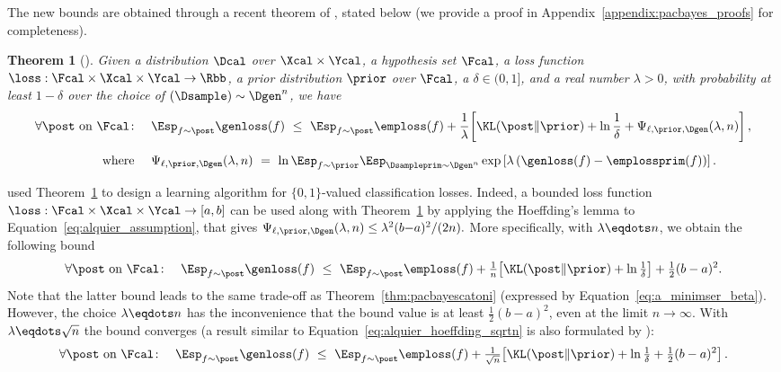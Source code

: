 \documentclass{article}
\newtheorem{thm}{Theorem}
\theoremstyle{definition}
\theoremstyle{plain}
\begin{document}
%
The new bounds are obtained through a recent theorem of \citet{alquier-15}, stated below
(we provide a proof in Appendix~\ref{appendix:pacbayes_proofs} for completeness).
%
%
%
%
\begin{thm}[\citet{alquier-15}] \label{thm:general-alquier}
	Given a distribution $\Dcal$ over  $\Xcal   \times   \Ycal$, a hypothesis set $\Fcal$, a loss function $\loss:\Fcal\times\Xcal\times\Ycal\to\Rbb$,   a prior distribution $\prior$ over $\Fcal$, a $\delta \in (0,1]$, and a real number $\lambda>0$,  
%
%
%
%
%
%
%
%
%
%
%
	with probability at least $1{-}\delta$ over the choice of $(\Dsample)\sim \Dgen^n$,
	we have
	\begin{align} \label{eq:alquier}
	\forall \post \text{ on } \Fcal\colon \quad &
	\Esp_{f\sim\post} \genloss(f) 
	\ \le \  \Esp_{f\sim\post} \emploss(f) +
	\dfrac{1}{\lambda}\!\left[ \KL(\post\|\prior) +
	\ln\dfrac{1}{\delta}
	+ \Psi_{\ell,\prior,\Dgen}(\lambda,n)  \right],\\[2mm]
%
\mbox{where }\quad &
	\label{eq:alquier_assumption}
\Psi_{\ell,\prior,\Dgen}(\lambda,n) \ = \ 
\ln	\Esp_{f\sim\prior} \Esp_{{\Dsampleprim\sim \Dgen^n}} 
	\exp\left[{\lambda\left(\genloss(f) - \emplossprim(f)\right)}\right].
	\end{align}
\end{thm}
%
%
%
\citeauthor{alquier-15} used Theorem~\ref{thm:general-alquier} to design a learning algorithm for $\{0,1\}$-valued classification losses.  
Indeed, a bounded loss function $\loss:\Fcal\times\Xcal\times\Ycal\to[a,b]$ can be used along with Theorem~\ref{thm:general-alquier} by applying the
Hoeffding's lemma to Equation~\eqref{eq:alquier_assumption}, that gives
$
%
\Psi_{\ell,\prior,\Dgen}(\lambda,n) \leq
\lambda^2(b{-}a)^2/(2n).
$
More specifically, with $\lambda\eqdots n$, we obtain the following bound
\begin{align} \label{eq:alquier_hoeffding_n}
\forall \post \text{ on } \Fcal\colon \quad 
\Esp_{f\sim\post} \genloss(f) 
\ \le \  \Esp_{f\sim\post} \emploss(f) +
\tfrac{1}{n}\!\left[  \KL(\post\|\prior) +
\ln\tfrac{1}{\delta}\right]+\tfrac12(b-a)^2.
\end{align}
Note that the latter bound leads to the same trade-off as Theorem~\ref{thm:pacbayescatoni} (expressed by Equation~\ref{eq:a_minimser_beta}).
However, the choice $\lambda\eqdots n$ has the inconvenience that the bound value is at least $\frac12(b-a)^2$, even at the limit $n\to\infty$. With $\lambda\eqdots \sqrt n$ the bound converges (a result similar to Equation~\eqref{eq:alquier_hoeffding_sqrtn} is also formulated by \citet{pentina-14}):
\begin{align} \label{eq:alquier_hoeffding_sqrtn}
\forall \post \text{ on } \Fcal\colon \quad 
\Esp_{f\sim\post} \genloss(f) 
\ \le \  \Esp_{f\sim\post} \emploss(f) +
\tfrac{1}{\sqrt n}\!\left[  \KL(\post\|\prior) +
\ln\tfrac{1}{\delta} +\tfrac12(b-a)^2 \right].
\end{align}
%
\end{document}
